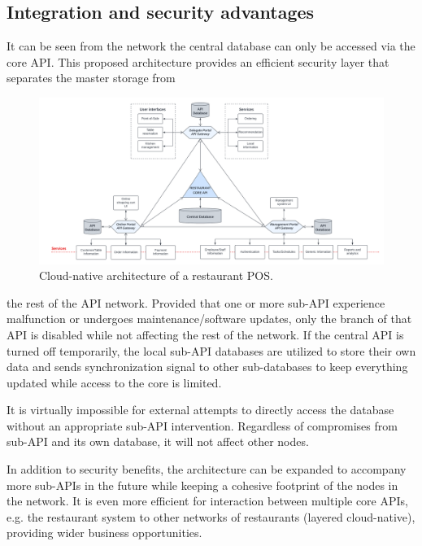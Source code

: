 \documentclass[12pt, a4paper]{article}
\theoremstyle{styleth}
\theoremstyle{styledef}
\begin{document}
\subsection{Integration and security advantages}

It can be seen from the network the central database can only be accessed via the core API. This proposed architecture provides an efficient security layer that separates the master storage from 

\begin{figure}
	\centering
	\includegraphics[width=23cm]{Cloud-native Arch.png}
	\caption{Cloud-native architecture of a restaurant POS.}
	\label{fig:archdiag}
\end{figure}

\noindent the rest of the API network. Provided that one or more sub-API experience malfunction or undergoes maintenance/software updates, only the branch of that API is disabled while not affecting the rest of the network. If the central API is turned off temporarily, the local sub-API databases are utilized to store their own data and sends synchronization signal to other sub-databases to keep everything updated while access to the core is limited.

\vspace{5mm}
It is virtually impossible for external attempts to directly access the database without an appropriate sub-API intervention. Regardless of compromises from sub-API and its own database, it will not affect other nodes.

\vspace{5mm}
In addition to security benefits, the architecture can be expanded to accompany more sub-APIs in the future while keeping a cohesive footprint of the nodes in the network. It is even more efficient for interaction between multiple core APIs, e.g. the restaurant system to other networks of restaurants (layered cloud-native), providing wider business opportunities.
\end{document}
